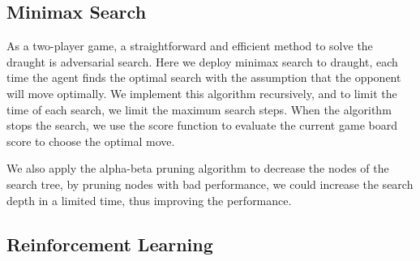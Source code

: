 \subsection{Minimax Search}
As a two-player game, a straightforward and efficient method to solve the draught is adversarial search. Here we deploy minimax search to draught, each time the agent finds the optimal search with the assumption that the opponent will move optimally. We implement this algorithm recursively, and to limit the time of each search, we limit the maximum search steps. When the algorithm stops the search, we use the score function to evaluate the current game board score to choose the optimal move. 

We also apply the alpha-beta pruning algorithm to decrease the nodes of the search tree, by pruning nodes with bad performance, we could increase the search depth in a limited time, thus improving the performance. 

\subsection{Reinforcement Learning}
